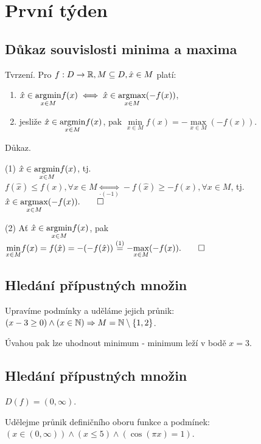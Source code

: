 \section{První týden}

\subsection{Důkaz souvislosti minima a maxima}

Tvrzení. Pro $f: D \rightarrow \mathbb{R}, M \subseteq D, \hat{x} \in M$ platí:

\begin{enumerate}[(1)]
    \item $\hat{x} \in \underset{x \in M}{\operatorname*{argmin}} f(x) \iff \hat{x} \in \underset{x \in M}{\operatorname*{argmax}} (-f(x))$,
    \item jesliže $\hat{x} \in \underset{x \in M}{\operatorname*{argmin}} f(x)$, pak $\underset{x \in M}{\min} f(x) =
    - \underset{x \in M}{\max} (-f(x))$.
\end{enumerate}
Důkaz.

(1) $\hat{x} \in \underset{x \in M}{\operatorname*{argmin}} f(x)$, tj. $f(\hat{x}) \leq f(x), \forall x \in M \underset{\cdot (-1)}{\iff}
-f(\hat{x}) \geq -f(x), \forall x \in M$, tj. $\hat{x} \in \underset{x \in M}{\operatorname*{argmax}} (-f(x)). \qed$


(2) Ať $\hat{x} \in \underset{x \in M}{\operatorname*{argmin}} f(x)$, pak $\underset{x \in M}{\min} f(x) = f(\hat{x}) =
- (- f(\hat{x})) \overset{(1)}{=} - \underset{x \in M}{\max} (-f(x)). \qed$

\subsection{Hledání přípustných množin}
Upravíme podmínky a uděláme jejich průnik: $(x - 3 \geq 0) \land (x \in \mathbb{N}) \Rightarrow M = \mathbb{N} \setminus \left\lbrace 1,2 \right\rbrace$.

Úvahou pak lze uhodnout minimum - minimum leží v bodě $x=3$.

\subsection{Hledání přípustných množin}
$D(f) = (0, \infty)$.

Udělejme průnik definičního oboru funkce a podmínek: $(x \in (0, \infty)) \land (x \leq 5) \land (\cos(\pi x)=1)$.

